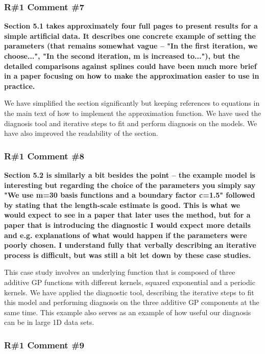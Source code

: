 \documentclass[11pt]{report}
\begin{document}
\subsubsection*{R\#1 Comment \#7}

\textbf{Section 5.1 takes approximately four full pages to present results for a simple artificial data. It describes one concrete example of setting the parameters (that remains somewhat vague -- "In the first iteration, we choose...", "In the second iteration, m is increased to..."), but the detailed comparisons against splines could have been much more brief in a paper focusing on how to make the approximation easier to use in practice.}

We have simplified the section significantly but keeping references to equations in the main text of how to implement the approximation function. We have used the diagnosis tool and iterative steps to fit and perform diagnosis on the models. We have also improved the readability of the section.

\subsubsection*{R\#1 Comment \#8}

\textbf{Section 5.2 is similarly a bit besides the point -- the example model is interesting but regarding the choice of the parameters you simply say "We use m=30 basis functions and a boundary factor c=1.5" followed by stating that the length-scale estimate is good. This is what we would expect to see in a paper that later uses the method, but for a paper that is introducing the diagnostic I would expect more details and e.g. explanations of what would happen if the parameters were poorly chosen. I understand fully that verbally describing an iterative process is difficult, but was still a bit let down by these case studies.}

This case study involves an underlying function that is composed of three additive GP functions with different kernels, squared exponential and a periodic kernels. We have applied the diagnostic tool, describing the iterative steps to fit this model and performing diagnosis on the three additive GP components at the same time. This example also serves as an example of how useful our diagnosis can be in large 1D data sets.

\subsubsection*{R\#1 Comment \#9}
\end{document}

